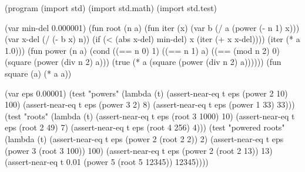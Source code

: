 \begin{spiral}
(program
  (import std)
  (import std.math)
  (import std.test)

  (var min-del 0.000001)
  (fun root (n a)
    (fun iter (x)
      (var b (/ a (power (- n 1) x)))
      (var x-del (/ (- b x) n))
      (if (< (abs x-del) min-del) x (iter (+ x x-del))))
    (iter (* a 1.0)))
  (fun power (n a)
    (cond
      ((== n 0) 1)
      ((== n 1) a)
      ((== (mod n 2) 0) (square (power (div n 2) a)))
      (true (* a (square (power (div n 2) a))))))
  (fun square (a) (* a a))

  (var eps 0.00001)
  (test "powers" (lambda (t) 
    (assert-near-eq t eps (power 2 10) 100)
    (assert-near-eq t eps (power 3 2) 8)
    (assert-near-eq t eps (power 1 33) 33)))
  (test "roots" (lambda (t)
    (assert-near-eq t eps (root 3 1000) 10)
    (assert-near-eq t eps (root 2 49) 7)
    (assert-near-eq t eps (root 4 256) 4)))
  (test "powered roots" (lambda (t)
    (assert-near-eq t eps (power 2 (root 2 2)) 2)
    (assert-near-eq t eps (power 3 (root 3 100)) 100)
    (assert-near-eq t eps (power 2 (root 2 13)) 13)
    (assert-near-eq t 0.01 (power 5 (root 5 12345)) 12345))))
\end{spiral}
